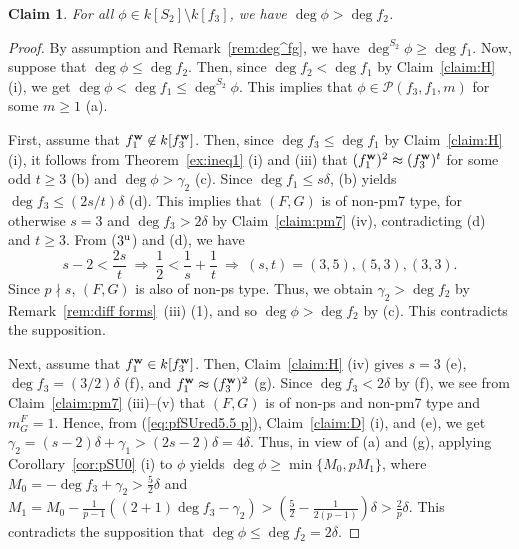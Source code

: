 \documentclass{amsart}
\theoremstyle{plain}
\newtheorem{claim}{Claim}
\theoremstyle{definition}
\newcommand{\sm}{\setminus}
\newcommand{\w}{{\bf w}}
\begin{document}
\begin{claim}\label{claim:S2}
For all $\phi \in k[S_2]\sm k[f_3]$, 
we have $\deg \phi >\deg f_2$. 
\end{claim}
\begin{proof}
By assumption and Remark~\ref{rem:deg^fg}, 
we have $\deg ^{S_2}\phi \ge \deg f_1$. 
Now, 
suppose that $\deg \phi \le \deg f_2$. 
Then, 
since $\deg f_2<\deg f_1$ by Claim~\ref{claim:H} (i), 
we get $\deg \phi <\deg f_1\le \deg ^{S_2}\phi $. 
This implies that 
$\phi \in \mathcal{P}(f_3,f_1,m)$ for some $m\ge 1$ (a). 


First, 
assume that $f_1^{\w }\not\in k[f_3^{\w }]$. 
Then, since $\deg f_3\le \deg f_1$ by Claim~\ref{claim:H} (i), 
it follows from Theorem~\ref{ex:ineq1} (i) and (iii) 
that $(f_1^{\w })^2\approx (f_3^{\w })^t$ for some odd $t\ge 3$ (b) 
and $\deg \phi >\gamma _2$ (c). 
Since $\deg f_1\le s\delta $, 
(b) yields 
$\deg f_3\le (2s/t)\delta $ (d). 
This implies that $(F,G)$ is of non-pm7 type, 
for otherwise $s=3$ and $\deg f_3>2\delta $ 
by Claim~\ref{claim:pm7} (iv), 
contradicting (d) and $t\ge 3$. 
From ($3^{\rm u}$) and (d), we have 
\begin{equation}\label{eq:1/t+1/s}
s-2<\frac{2s}{t}\ \Rightarrow \ 
\frac{1}{2}<\frac{1}{s}+\frac{1}{t}
\ \Rightarrow \ 
(s,t)=(3,5),(5,3),(3,3). 
\end{equation}
Since $p\nmid s$, 
$(F,G)$ is also of non-ps type. 
Thus, 
we obtain $\gamma _2>\deg f_2$ by Remark~\ref{rem:diff forms}~(iii) (1), 
and so $\deg \phi >\deg f_2$ by (c). 
This contradicts the supposition. 


Next, assume that $f_1^{\w }\in k[f_3^{\w }]$. 
Then, Claim~\ref{claim:H} (iv) gives 
$s=3$ (e), 
$\deg f_3=(3/2)\delta $ (f), 
and $f_1^{\w }\approx (f_3^{\w })^2$ (g). 
Since $\deg f_3<2\delta $ by (f), 
we see from Claim~\ref{claim:pm7} (iii)--(v) that 
$(F,G)$ is of non-ps and non-pm7 type and $m_G^F=1$. 
Hence, from 
(\ref{eq:pfSUred5.5 p}), Claim~\ref{claim:D} (i), and (e), 
we get $\gamma _2=(s-2)\delta +\gamma _1>(2s-2)\delta =4\delta $. 
Thus, in view of (a) and (g), 
applying Corollary~\ref{cor:pSU0} (i) to $\phi $ 
yields $\deg \phi \ge \min \{ M_0,pM_1\} $, 
where $M_0=
-\deg f_3 +\gamma _2
>\frac{5}{2}\delta $ 
and $M_1=M_0-\frac{1}{p-1}((2+1)\deg f_3-\gamma _2)
>(\frac{5}{2}-\frac{1}{2(p-1)})\delta >\frac{2}{p}\delta $. 
This contradicts the supposition 
that $\deg \phi \le \deg f_2=2\delta $. 
\end{proof}
\end{document}
